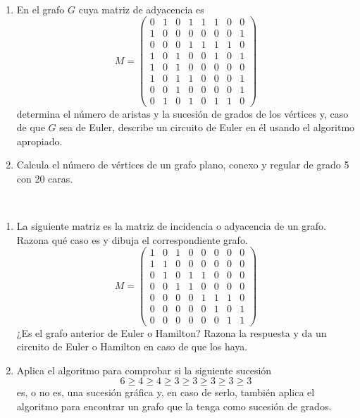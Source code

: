 \begin{ejercicio}\label{ej:1.23}~
    \begin{enumerate}
        \item En el grafo $G$ cuya matriz de adyacencia es
        \[
            M=\begin{pmatrix}
                0 & 1 & 0 & 1 & 1 & 1 & 0 & 0 \\
                1 & 0 & 0 & 0 & 0 & 0 & 0 & 1 \\
                0 & 0 & 0 & 1 & 1 & 1 & 1 & 0 \\
                1 & 0 & 1 & 0 & 0 & 1 & 0 & 1 \\
                1 & 0 & 1 & 0 & 0 & 0 & 0 & 0 \\
                1 & 0 & 1 & 1 & 0 & 0 & 0 & 1 \\
                0 & 0 & 1 & 0 & 0 & 0 & 0 & 1 \\
                0 & 1 & 0 & 1 & 0 & 1 & 1 & 0
            \end{pmatrix}
        \]
        determina el número de aristas y la sucesión de grados de los vértices y, caso de que $G$ sea de Euler, describe un circuito de Euler en él usando el algoritmo apropiado.
        
        \item Calcula el número de vértices de un grafo plano, conexo y regular de grado 5 con 20 caras.
    \end{enumerate}
\end{ejercicio}

\begin{ejercicio}\label{ej:1.24}~
    \begin{enumerate}
        \item La siguiente matriz es la matriz de incidencia o adyacencia de un grafo. Razona qué caso es y dibuja el correspondiente grafo.
        \[
            M=\begin{pmatrix}
                1 & 0 & 1 & 0 & 0 & 0 & 0 & 0 \\
                1 & 1 & 0 & 0 & 0 & 0 & 0 & 0 \\
                0 & 1 & 0 & 1 & 1 & 0 & 0 & 0 \\
                0 & 0 & 1 & 1 & 0 & 0 & 0 & 0 \\
                0 & 0 & 0 & 0 & 1 & 1 & 1 & 0 \\
                0 & 0 & 0 & 0 & 0 & 1 & 0 & 1 \\
                0 & 0 & 0 & 0 & 0 & 0 & 1 & 1
            \end{pmatrix}
        \]
        ¿Es el grafo anterior de Euler o Hamilton? Razona la respuesta y da un circuito de Euler o Hamilton en caso de que los haya.
        
        \item Aplica el algoritmo para comprobar si la siguiente sucesión $$6 \geq 4 \geq 4 \geq 3 \geq 3 \geq 3 \geq 3 \geq 3$$ es, o no es, una sucesión gráfica y, en caso de serlo, también aplica el algoritmo para encontrar un grafo que la tenga como sucesión de grados.
    \end{enumerate}
\end{ejercicio}


